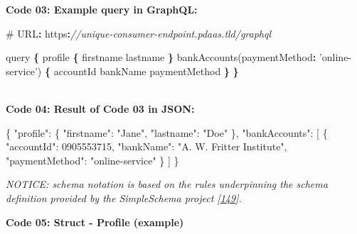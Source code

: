 \documentclass[12pt,english,a4paper,titlepage,cleardoublepage=empty,dottedtoc]{report}
\newenvironment{Shaded}{\begin{snugshade}}{\end{snugshade}}
\newcommand{\DataTypeTok}[1]{\textcolor[rgb]{0.13,0.29,0.53}{#1}}
\newcommand{\DecValTok}[1]{\textcolor[rgb]{0.00,0.00,0.81}{#1}}
\newcommand{\StringTok}[1]{\textcolor[rgb]{0.31,0.60,0.02}{#1}}
\newcommand{\CommentTok}[1]{\textcolor[rgb]{0.56,0.35,0.01}{\textit{#1}}}
\newcommand{\OtherTok}[1]{\textcolor[rgb]{0.56,0.35,0.01}{#1}}
\newcommand{\FunctionTok}[1]{\textcolor[rgb]{0.00,0.00,0.00}{#1}}
\newcommand{\OperatorTok}[1]{\textcolor[rgb]{0.81,0.36,0.00}{\textbf{#1}}}
\newcommand{\AttributeTok}[1]{\textcolor[rgb]{0.77,0.63,0.00}{#1}}
\newcommand{\NormalTok}[1]{#1}
\begin{document}
\newpage

\textbf{\protect\hypertarget{code-03_graphql-query}{}{Code 03: Example
query in GraphQL}:}

\begin{Shaded}
\begin{Highlighting}[numbers=left,,]
\NormalTok{# URL}\OperatorTok{:}\NormalTok{ https}\OperatorTok{:}\CommentTok{//unique-consumer-endpoint.pdaas.tld/graphql}

\NormalTok{query }\OperatorTok{\{}
\NormalTok{    profile }\OperatorTok{\{}
\NormalTok{        firstname}
\NormalTok{        lastname}
    \OperatorTok{\}}
    \AttributeTok{bankAccounts}\NormalTok{(}\DataTypeTok{paymentMethod}\OperatorTok{:} \StringTok{'online-service'}\NormalTok{) }\OperatorTok{\{}
\NormalTok{        accountId}
\NormalTok{        bankName}
\NormalTok{        paymentMethod}
    \OperatorTok{\}}
\OperatorTok{\}}
\end{Highlighting}
\end{Shaded}

~\\
\textbf{\protect\hypertarget{code-04_graphql-query-result}{}{Code 04:
Result of Code 03 in JSON}:}

\begin{Shaded}
\begin{Highlighting}[numbers=left,,]
\FunctionTok{\{}
    \DataTypeTok{"profile"}\FunctionTok{:} \FunctionTok{\{}
        \DataTypeTok{"firstname"}\FunctionTok{:} \StringTok{"Jane"}\FunctionTok{,} 
        \DataTypeTok{"lastname"}\FunctionTok{:} \StringTok{"Doe"}
    \FunctionTok{\},}
    \DataTypeTok{"bankAccounts"}\FunctionTok{:} \OtherTok{[}
        \FunctionTok{\{}
            \DataTypeTok{"accountId"}\FunctionTok{:} \DecValTok{0905553715}\FunctionTok{,}
            \DataTypeTok{"bankName"}\FunctionTok{:} \StringTok{"A. W. Fritter Institute"}\FunctionTok{,}
            \DataTypeTok{"paymentMethod"}\FunctionTok{:} \StringTok{"online-service"}
        \FunctionTok{\}}
    \OtherTok{]}
\FunctionTok{\}}
\end{Highlighting}
\end{Shaded}

\newpage

\emph{NOTICE: schema notation is based on the rules underpinning the
schema definition provided by the SimpleSchema project
{[}\protect\hyperlink{ref-web_2017_repo_node-simple-schema}{149}{]}.}

\textbf{\protect\hypertarget{code-05_struct_profile}{}{Code 05: Struct -
Profile (example)}}
\end{document}
